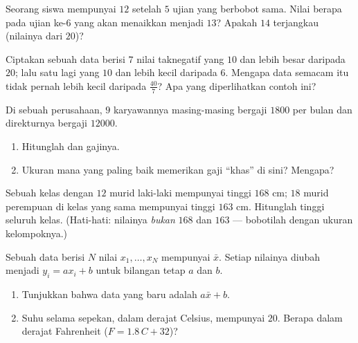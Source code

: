 \begin{exercise}[$\star\star$]\label{exo:g10:stats:5}
Seorang siswa mempunyai  $12$ setelah $5$ ujian yang berbobot
sama. Nilai berapa pada ujian ke-$6$ yang akan menaikkan  menjadi
$13$? Apakah  $14$ terjangkau (nilainya dari $20$)?
\end{exercise}

\begin{exercise}[$\star\star$]\label{exo:g10:stats:6}
Ciptakan sebuah data berisi $7$ nilai taknegatif yang  $10$ dan
 lebih besar daripada $20$; lalu satu lagi yang  $10$ dan
 lebih kecil daripada $6$. Mengapa  data semacam itu tidak
pernah lebih kecil daripada $\frac{40}{7}$? Apa yang diperlihatkan contoh ini?
\end{exercise}

\begin{exercise}[$\star\star$]\label{exo:g10:stats:7}
Di sebuah perusahaan, $9$ karyawannya masing-masing bergaji $1800$ per bulan
dan direkturnya bergaji $12000$.
\begin{enumerate}
  \item Hitunglah  dan  gajinya.
  \item Ukuran mana yang paling baik memerikan gaji ``khas'' di sini? Mengapa?
\end{enumerate}
\end{exercise}

\begin{exercise}[$\star\star$]\label{exo:g10:stats:8}
Sebuah kelas dengan $12$ murid laki-laki mempunyai  tinggi $168$ cm;
$18$ murid perempuan di kelas yang sama mempunyai  tinggi $163$ cm.
Hitunglah  tinggi seluruh kelas. (Hati-hati: nilainya \emph{bukan}
 $168$ dan $163$ --- bobotilah  dengan ukuran kelompoknya.)
\end{exercise}

\begin{exercise}[$\star\star\star$]\label{exo:g10:stats:9}
Sebuah data berisi $N$ nilai $x_1, \dots, x_N$ mempunyai  $\bar x$.
Setiap nilainya diubah menjadi $y_i = a x_i + b$ untuk bilangan tetap $a$ dan $b$.
\begin{enumerate}
  \item Tunjukkan bahwa  data yang baru adalah $a \bar x + b$.
  \item Suhu selama sepekan, dalam derajat Celsius, mempunyai
         $20$.
        Berapa  dalam derajat Fahrenheit
        ($F = 1.8\,C + 32$)?
\end{enumerate}
\end{exercise}

